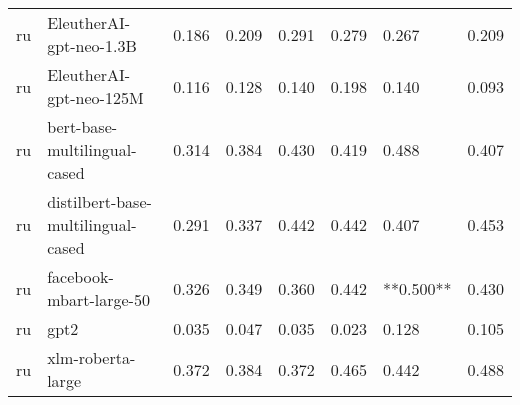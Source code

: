 \begin{tabular}{llllllll}
      ru &            EleutherAI-gpt-neo-1.3B & 0.186 &                     0.209 &                 0.291 &                  0.279 &                                   0.267 &     0.209 \\
      ru &            EleutherAI-gpt-neo-125M & 0.116 &                     0.128 &                 0.140 &                  0.198 &                                   0.140 &     0.093 \\
      ru &       bert-base-multilingual-cased & 0.314 &                     0.384 &                 0.430 &                  0.419 &                                   0.488 &     0.407 \\
      ru & distilbert-base-multilingual-cased & 0.291 &                     0.337 &                 0.442 &                  0.442 &                                   0.407 &     0.453 \\
      ru &            facebook-mbart-large-50 & 0.326 &                     0.349 &                 0.360 &                  0.442 &                               **0.500** &     0.430 \\
      ru &                               gpt2 & 0.035 &                     0.047 &                 0.035 &                  0.023 &                                   0.128 &     0.105 \\
      ru &                  xlm-roberta-large & 0.372 &                     0.384 &                 0.372 &                  0.465 &                                   0.442 &     0.488 \\
\bottomrule
\end{tabular}
